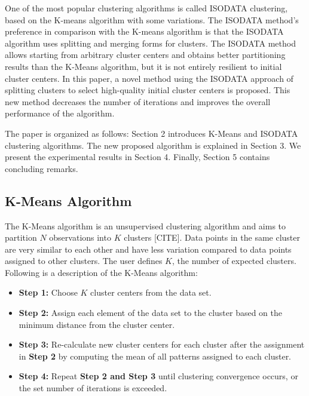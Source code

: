 \documentclass[twoside,twocolumn]{article}
\begin{document}
One of the most popular clustering algorithms is called ISODATA clustering,
based on the K-means algorithm with some variations. The ISODATA method's
preference in comparison with the K-means algorithm is that the ISODATA
algorithm uses splitting and merging forms for clusters. The ISODATA method
allows starting from arbitrary cluster centers and obtains better partitioning
results than the K-Means algorithm, but it is not entirely resilient to initial
cluster centers. In this paper, a novel method using the ISODATA approach of
splitting clusters to select high-quality initial cluster centers is proposed.
This new method decreases the number of iterations and improves the overall
performance of the algorithm.

The paper is organized as follows: Section 2 introduces K-Means and ISODATA
clustering algorithms. The new proposed algorithm is explained in Section 3. We
present the experimental results in Section 4. Finally, Section 5 contains
concluding remarks.


\subsection{K-Means Algorithm}

The K-Means algorithm is an unsupervised clustering algorithm and aims to
partition $N$ observations into $K$ clusters [CITE]. Data points in the same
cluster are very similar to each other and have less variation compared to data
points assigned to other clusters. The user defines $K$, the number of expected
clusters. Following is a description of the K-Means algorithm:

\begin{itemize}
\item \textbf{Step 1:} Choose $K$ cluster centers from the data set.
\item \textbf{Step 2:} Assign each element of the data set to the cluster based
on the minimum distance from the cluster center.
\item \textbf{Step 3:} Re-calculate new cluster centers for each cluster after
the assignment in \textbf{Step 2} by computing the mean of all patterns
assigned to each cluster.
\item \textbf{Step 4:} Repeat \textbf{Step 2 and Step 3} until clustering
convergence occurs, or the set number of iterations is exceeded.
\end{itemize}
\end{document}
